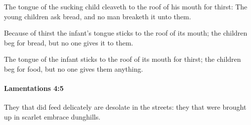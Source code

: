 			\begin{versebox}
					\item[BHS] 
					\item[LXX] 
					\item[ASV] The tongue of the sucking child cleaveth to the roof of his mouth for thirst: The young children ask bread, and no man breaketh it unto them.
					\item[NIV] Because of thirst the infant’s tongue sticks to the roof of its mouth; the children beg for bread, but no one gives it to them.
					\item[NRSV] The tongue of the infant sticks to the roof of its mouth for thirst; the children beg for food, but no one gives them anything.
			\end{versebox}

		\paragraph{Lamentations 4:5} %
			\label{LAMENTATIONS-4-5}

			They that did feed delicately are desolate in the streets: they that were brought up in scarlet embrace dunghills.

